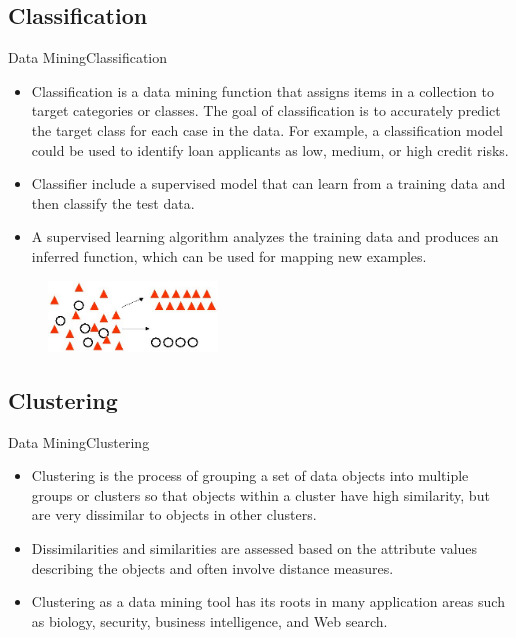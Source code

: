 \documentclass[10pt]{beamer}
\begin{document}
\subsection{Classification}
\begin{frame}{Data Mining}{Classification}
\begin{itemize}
\item Classification is a data mining function that assigns items in a collection to target categories or classes. The goal of classification is to accurately predict the target class for each case in the data. For example, a classification model could be used to identify loan applicants as low, medium, or high credit risks.

\item Classifier include a supervised model that can learn from a training data and then classify the test data.

\item A supervised learning algorithm analyzes the training data and produces an inferred function, which can be used for mapping new examples.

\end{itemize}
\begin{figure}[H]
	\centering
	\includegraphics[width=0.4\textwidth]{images/Classification.PNG}
 
\end{figure}

\end{frame}
\subsection{Clustering}
\begin{frame}{Data Mining}{Clustering}

\begin{itemize}
\item Clustering is the process of grouping a set of data objects into multiple groups or clusters
so that objects within a cluster have high similarity, but are very dissimilar to objects in
other clusters.
\item Dissimilarities and similarities are assessed based on the attribute values describing the
objects and often involve distance measures.
\item Clustering as a data mining tool has its roots in many application areas such as biology,
security, business intelligence, and Web search.
\end{itemize}

\end{frame}
\end{document}
